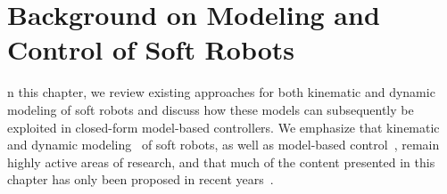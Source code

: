 \chapter{Background on Modeling and Control of Soft Robots}\label{chp:background}

n this chapter, we review existing approaches for both kinematic and dynamic modeling of soft robots and discuss how these models can subsequently be exploited in closed-form model-based controllers.
We emphasize that kinematic and dynamic modeling~\citep{armanini2023soft} of soft robots, as well as model-based control~\citep{della2023model}, remain highly active areas of research, and that much of the content presented in this chapter has only been proposed in recent years~\citep{yasa2023overview}.




